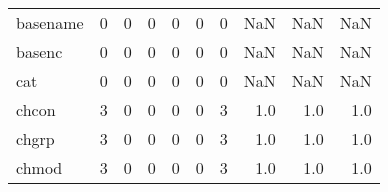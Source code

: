 \begin{tabular}{lrrrrrrrrr}
basename  &                                       0 &                                                  0 &                                                  0 &                                                  0 &                                                  0 &                                                  0 &                                                NaN &                                    NaN &                                  NaN \\
basenc    &                                       0 &                                                  0 &                                                  0 &                                                  0 &                                                  0 &                                                  0 &                                                NaN &                                    NaN &                                  NaN \\
cat       &                                       0 &                                                  0 &                                                  0 &                                                  0 &                                                  0 &                                                  0 &                                                NaN &                                    NaN &                                  NaN \\
chcon     &                                       3 &                                                  0 &                                                  0 &                                                  0 &                                                  0 &                                                  3 &                                                1.0 &                                    1.0 &                                  1.0 \\
chgrp     &                                       3 &                                                  0 &                                                  0 &                                                  0 &                                                  0 &                                                  3 &                                                1.0 &                                    1.0 &                                  1.0 \\
chmod     &                                       3 &                                                  0 &                                                  0 &                                                  0 &                                                  0 &                                                  3 &                                                1.0 &                                    1.0 &                                  1.0 \\

\end{tabular}
